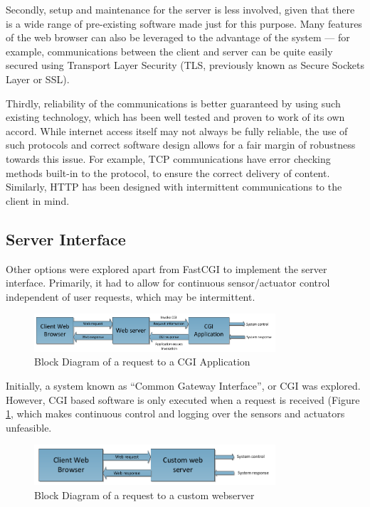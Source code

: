 Secondly, setup and maintenance for the server is less involved, given that there is a wide range of pre-existing software made just for this purpose. Many features of the web browser can also be leveraged to the advantage of the system --- for example, communications between the client and server can be quite easily secured using Transport Layer Security (TLS, previously known as Secure Sockets Layer or SSL).

Thirdly, reliability of the communications is better guaranteed by using such existing technology, which has been well tested and proven to work of its own accord. While internet access itself may not always be fully reliable, the use of such protocols and correct software design allows for a fair margin of robustness towards this issue. For example, TCP communications have error checking methods built-in to the protocol, to ensure the correct delivery of content. Similarly, HTTP has been designed with intermittent communications to the client in mind\cite{rfc2616}.

\subsection{Server Interface} \label{Server Interface}
Other options were explored apart from FastCGI to implement the server interface. Primarily, it had to allow for continuous sensor/actuator control independent of user requests, which may be intermittent.

\begin{figure}[H]
	\centering
	\includegraphics[width=0.8\textwidth]{figures/cgi.png}
	\caption{Block Diagram of a request to a CGI Application} 
	\label{cgi.png}
\end{figure}

Initially, a system known as ``Common Gateway Interface'', or CGI was explored. However, CGI based software is only executed when a request is received (Figure \ref{cgi.png}, which makes continuous control and logging over the sensors and actuators unfeasible. 

\begin{figure}[H]
	\centering
	\includegraphics[width=0.8\textwidth]{figures/custom_webserver.png}
	\caption{Block Diagram of a request to a custom webserver} 
	\label{custom_webserver.png}
\end{figure}


